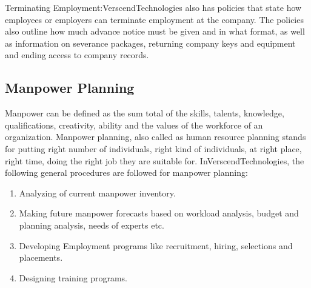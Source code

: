Terminating Employment:VerscendTechnologies also has policies that state how
employees or employers can terminate employment at the company. The policies also outline how
much advance notice must be given and in what format, as well as information on severance packages,
returning company keys and equipment and ending access to company records.
\subsection{Manpower Planning}
Manpower can be defined as the sum total of the skills, talents, knowledge, qualifications, creativity, ability
and the values of the workforce of an organization. Manpower planning, also called as human resource
planning stands for putting right number of individuals, right kind of individuals, at right place, right time,
doing the right job they are suitable for.
InVerscendTechnologies, the following general procedures are followed for manpower planning:
\begin{enumerate}
\item
 Analyzing of current manpower inventory.
\item
 Making future manpower forecasts based on workload analysis, budget and planning analysis, needs
of experts etc.
\item
 Developing Employment programs like recruitment, hiring, selections and placements.
\item
 Designing training programs.
\end{enumerate}
